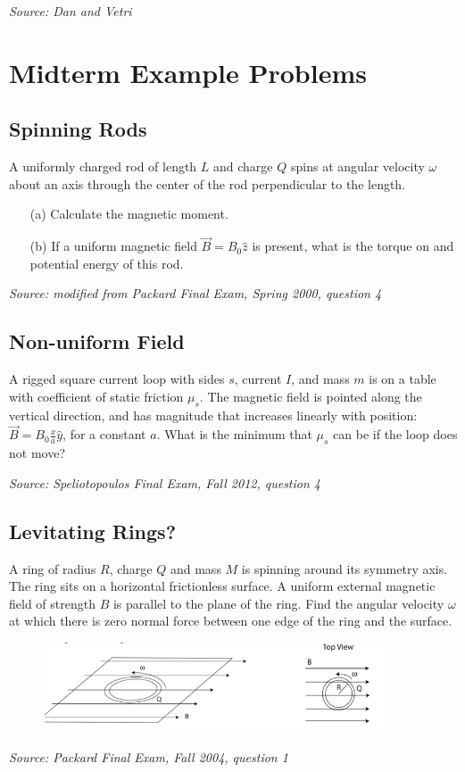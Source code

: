 \documentclass{article}
\begin{document}
\textit{Source: Dan and Vetri}

\section{Midterm Example Problems}

\subsection{Spinning Rods}

A uniformly charged rod of length $L$ and charge $Q$ spins at angular velocity $\omega$ about an axis through the center of the rod perpendicular to the length.
\begin{itemize}
	\item[(a)] Calculate the magnetic moment.
	\item[(b)] If a uniform magnetic field $\vec{B}=B_0\hat{z}$ is present, what is the torque on and potential energy of this rod.
\end{itemize}

\textit{Source: modified from Packard Final Exam, Spring 2000, question 4}

\subsection{Non-uniform Field}

A rigged square current loop with sides $s$, current $I$, and mass $m$ is on a table with coefficient of static friction $\mu_s$. The magnetic field is pointed along the vertical direction, and has magnitude that increases linearly with position: $\vec{B}=B_0\frac{x}{a}\hat{y}$, for a constant $a$. What is the minimum that $\mu_s$ can be if the loop does not move?

\textit{Source: Speliotopoulos Final Exam, Fall 2012, question 4}

\subsection{Levitating Rings?}

A ring of radius $R$, charge $Q$ and mass $M$ is spinning around its symmetry axis. The ring sits on a horizontal frictionless surface. A uniform external magnetic field of strength $B$ is parallel to the plane of the ring. Find the angular velocity $\omega$ at which there is zero normal force between one edge of the ring and the surface.

\begin{figure}[h]
	\begin{center}
		\includegraphics[width=0.9\textwidth]{Ring.png}
	\end{center}
\end{figure}

\textit{Source: Packard Final Exam, Fall 2004, question 1}
\end{document}
